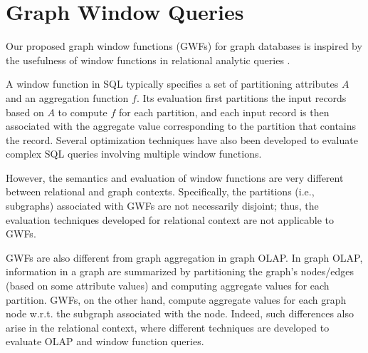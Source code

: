 \section{Graph Window Queries}
Our proposed graph window functions (GWFs) for graph databases is inspired by the usefulness of window functions in relational analytic queries
\cite{zemke2012s}.

A window function in SQL typically specifies a set of partitioning attributes $A$ and an aggregation function $f$.
Its evaluation first partitions the input records based on $A$ to compute $f$ for each partition,
and each input record is then associated with the aggregate value corresponding to the partition that contains the record.
Several optimization techniques \cite{cao2012optimization, bellamkonda2013adaptive}
have also been developed to evaluate complex SQL queries involving multiple window functions.

However, the semantics and evaluation of window functions are very different between relational and graph contexts.
Specifically, the partitions (i.e., subgraphs) associated with GWFs are not necessarily disjoint; thus,
the evaluation techniques developed for relational context \cite{cao2012optimization, bellamkonda2013adaptive} are not applicable to GWFs. %

GWFs are also different from graph aggregation \cite{zhao2011graph,wang2014pagrol,chen2008graph,tian2008efficient} in graph OLAP.
In graph OLAP, information in a graph are summarized
by partitioning the graph's nodes/edges (based on some attribute values) and computing aggregate values for each partition.
GWFs, on the other hand, compute aggregate values for each graph node w.r.t. the subgraph associated with the node.
Indeed, such differences also arise in the relational context, where different 
techniques are developed to evaluate OLAP and window function queries.

